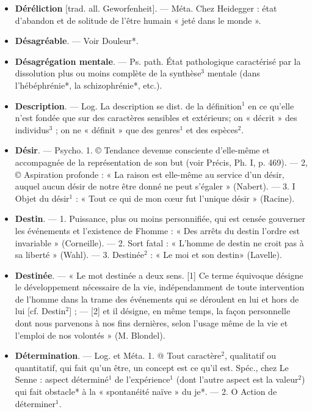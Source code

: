 \begin{itemize}[leftmargin=1cm, label=, itemsep=1pt]
\item {\bf Déréliction} [trad. all. Geworfenheit]. —
Méta. Chez Heidegger : état d'abandon
et de solitude de l’être humain « jeté
dans le monde ».

\item {\bf Désagréable}. — Voir Douleur*.

\item {\bf Désagrégation mentale}. — Ps. path.
État pathologique caractérisé par la
dissolution plus ou moins complète
de la synthèse$^3$ mentale (dans
l'hébéphrénie*, la schizophrénie*,
etc.).

\item {\bf Description}. — Log. La description
se dist. de la définition$^1$ en ce qu’elle
n’est fondée que sur des caractères
sensibles et extérieurs; on « décrit »
des individus$^3$ ; on ne « définit » que
des genres$^1$ et des espèces$^2$.

\item {\bf Désir}. — Psycho. 1. © Tendance devenue consciente d'elle-même et
accompagnée de la représentation
de son but (voir Précis, Ph. I, p. 469).
— 2, © Aspiration profonde : « La
raison est elle-même au service d’un
désir, auquel aucun désir de notre
être donné ne peut s'égaler » (Nabert). — 3. I Objet du désir$^1$ : « Tout
ce qui de mon cœur fut l’unique
désir » (Racine).

\item {\bf Destin}. — 1. Puissance, plus ou moins
personnifiée, qui est censée gouverner les événements et l'existence de
Fhomme : « Des arrêts du destin
l’ordre est invariable » (Corneille). —
2. Sort fatal : « L'homme de destin
ne croit pas à sa liberté » (Wahl). —
3. Destinée$^2$ : « Le moi et son destin»
(Lavelle).

\item {\bf Destinée}. — « Le mot destinée a deux
sens. [1] Ce terme équivoque désigne le développement nécessaire
de la vie, indépendamment de toute
intervention de l’homme dans la
trame des événements qui se déroulent en lui et hors de lui [cf. Destin$^2$] ;
— [2] et il désigne, en même temps,
la façon personnelle dont nous parvenons à nos fins dernières, selon
l'usage même de la vie et l'emploi
de nos volontés » (M. Blondel).

\item {\bf Détermination}. — Log. et Méta. 1.
@ Tout caractère$^2$, qualitatif ou quantitatif, qui fait qu'un être, un concept est ce qu'il est. Spéc., chez Le
Senne : aspect déterminé$^1$ de l’expérience$^1$ (dont l’autre aspect est la
valeur$^2$) qui fait obstacle* à la
« spontanéité naïve » du je*. —
2. O Action de déterminer$^1$.


\end{itemize}
